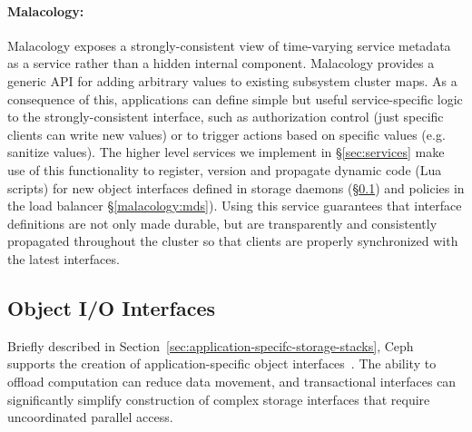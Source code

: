 \documentclass[preprint]{sigplanconf-eurosys}
\begin{document}
\paragraph*{Malacology:} Malacology exposes a strongly-consistent view of
time-varying service metadata as a service rather than a hidden internal
component. Malacology provides a generic API for adding arbitrary values to
existing subsystem cluster maps. As a consequence of this, applications can
define simple but useful service-specific logic to the strongly-consistent
interface, such as authorization control (just specific clients can write new
values) or to trigger actions based on specific values (e.g. sanitize values).
The higher level services we implement in \S\ref{sec:services} make use of this
functionality to register, version and propagate dynamic code (Lua scripts) for
new object interfaces defined in storage daemons (\S\ref{object-data-interface}) and
policies in the load balancer \S\ref{malacology:mds}).  Using this service
guarantees that interface definitions are not only made durable, but are
transparently and consistently propagated throughout the cluster so that
clients are properly synchronized with the latest interfaces.


\subsection{Object I/O Interfaces}
\label{object-data-interface}

Briefly described in Section~\ref{sec:application-specifc-storage-stacks}, Ceph
supports the creation of application-specific object
interfaces~\cite{weil_rados_2007}. The ability to offload computation can
reduce data movement, and transactional interfaces can significantly simplify
construction of complex storage interfaces that require uncoordinated parallel
access. 
\end{document}
